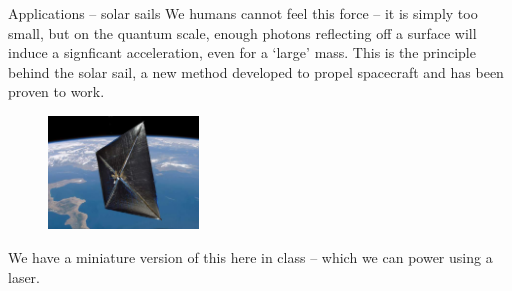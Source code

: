 \documentclass[../Main.tex]{subfiles}
\begin{document}
\begin{frame}{Applications -- solar sails}
    We humans cannot feel this force -- it is simply too small, but on the quantum scale, enough photons reflecting off a surface will induce a signficant acceleration, even for a `large' mass. This is the principle behind the solar sail, a new method developed to propel spacecraft and has been proven to work.

\begin{figure}
    \centering
    \includegraphics[height=3cm]{Quantum_Images/solarsail.png}
\end{figure}

We have a miniature version of this here in class -- which we can power using a laser.
\end{frame}
\end{document}
